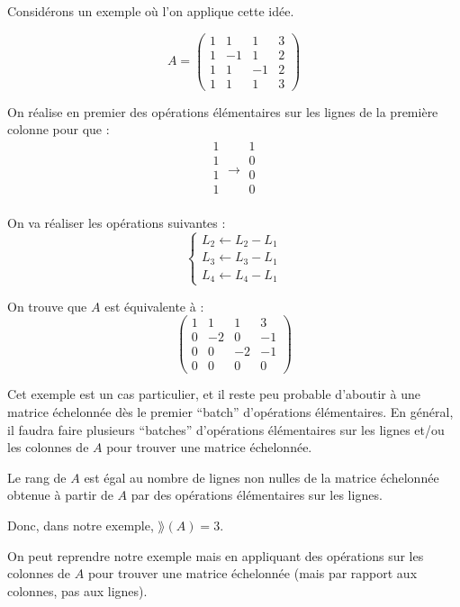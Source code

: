 \documentclass[12pt, a4paper]{report}
\begin{document}
Considérons un exemple où l'on applique cette idée.

$$A = \left(\begin{matrix}
    1 & 1 & 1 & 3 \\
    1 & -1 & 1 & 2 \\
    1 & 1 & -1 & 2 \\
    1 & 1 & 1 & 3
\end{matrix}\right)$$

On réalise en premier des opérations élémentaires sur les lignes de la première colonne pour que :
$$\begin{matrix}
1 \\
1 \\
1 \\
1 \\
\end{matrix} \rightarrow \begin{matrix}
1 \\
0 \\
0 \\
0 \\
\end{matrix}$$

On va réaliser les opérations suivantes :
$$\begin{cases}
L_2 \leftarrow L_2 - L_1 \\
L_3 \leftarrow L_3 - L_1 \\
L_4 \leftarrow L_4 - L_1
\end{cases}$$

On trouve que $A$ est équivalente à :
$$\left(\begin{matrix}
1 & 1 & 1 & 3 \\
0 & -2 & 0 & -1 \\
0 & 0 & -2 & -1 \\
0 & 0 & 0 & 0
\end{matrix}\right)$$

Cet exemple est un cas particulier, et il reste peu probable d'aboutir à une matrice échelonnée dès le premier ``batch'' d'opérations élémentaires. En général, il faudra faire plusieurs ``batches'' d'opérations élémentaires sur les lignes et/ou les colonnes de $A$ pour trouver une matrice échelonnée.

Le rang de $A$ est égal au nombre de lignes non nulles de la matrice échelonnée obtenue à partir de $A$ par des opérations élémentaires sur les lignes.

Donc, dans notre exemple, $\rang(A) = 3$.

On peut reprendre notre exemple mais en appliquant des opérations sur les colonnes de $A$ pour trouver une matrice échelonnée (mais par rapport aux colonnes, pas aux lignes).
\end{document}
